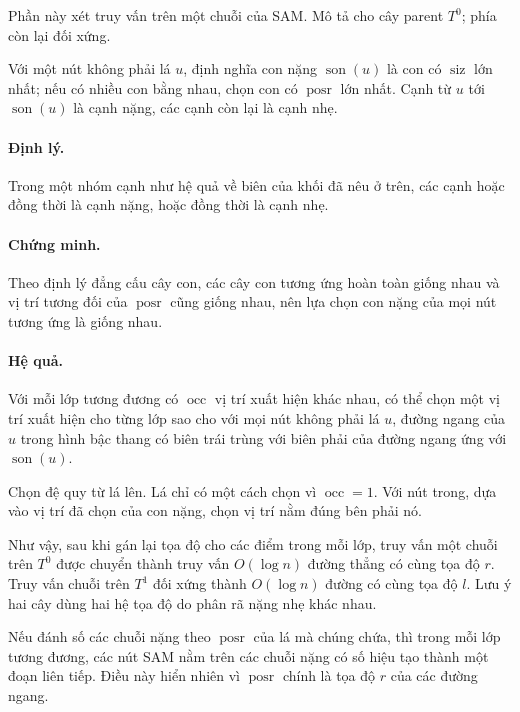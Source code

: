 \documentclass[11pt]{article}
\begin{document}
Phần này xét truy vấn trên một chuỗi của SAM. Mô tả cho cây parent \(T^0\); phía
còn lại đối xứng.

Với một nút không phải lá \(u\), định nghĩa con nặng \(\operatorname{son}(u)\)
là con có \(\operatorname{siz}\) lớn nhất; nếu có nhiều con bằng nhau, chọn con
có \(\operatorname{posr}\) lớn nhất. Cạnh từ \(u\) tới \(\operatorname{son}(u)\)
là cạnh nặng, các cạnh còn lại là cạnh nhẹ.

\paragraph{Định lý.}
Trong một nhóm cạnh như hệ quả về biên của khối đã nêu ở trên, các cạnh hoặc
đồng thời là cạnh nặng, hoặc đồng thời là cạnh nhẹ.

\paragraph{Chứng minh.}
Theo định lý đẳng cấu cây con, các cây con tương ứng hoàn toàn giống nhau và
vị trí tương đối của \(\operatorname{posr}\) cũng giống nhau, nên lựa chọn con
nặng của mọi nút tương ứng là giống nhau.

\paragraph{Hệ quả.}
Với mỗi lớp tương đương có \(\operatorname{occ}\) vị trí xuất hiện khác nhau,
có thể chọn một vị trí xuất hiện cho từng lớp sao cho với mọi nút không phải
lá \(u\), đường ngang của \(u\) trong hình bậc thang có biên trái trùng với
biên phải của đường ngang ứng với \(\operatorname{son}(u)\).

Chọn đệ quy từ lá lên. Lá chỉ có một cách chọn vì \(\operatorname{occ}=1\).
Với nút trong, dựa vào vị trí đã chọn của con nặng, chọn vị trí nằm đúng bên
phải nó.

Như vậy, sau khi gán lại tọa độ cho các điểm trong mỗi lớp, truy vấn một chuỗi
trên \(T^0\) được chuyển thành truy vấn \(O(\log n)\) đường thẳng có cùng tọa
độ \(r\). Truy vấn chuỗi trên \(T^1\) đối xứng thành \(O(\log n)\) đường có
cùng tọa độ \(l\). Lưu ý hai cây dùng hai hệ tọa độ do phân rã nặng nhẹ khác
nhau.

Nếu đánh số các chuỗi nặng theo \(\operatorname{posr}\) của lá mà chúng chứa,
thì trong mỗi lớp tương đương, các nút SAM nằm trên các chuỗi nặng có số hiệu
tạo thành một đoạn liên tiếp. Điều này hiển nhiên vì \(\operatorname{posr}\)
chính là tọa độ \(r\) của các đường ngang.
\end{document}

